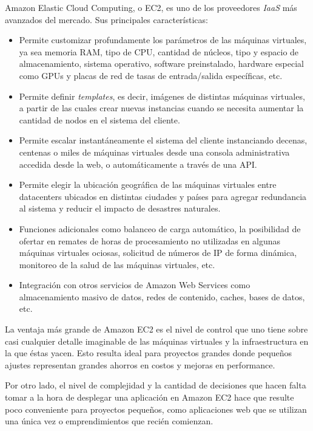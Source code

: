 \documentclass[a4paper,10pt,twoside]{article}
\begin{document}
Amazon Elastic Cloud Computing, o EC2, es uno de los proveedores \emph{IaaS} más avanzados del mercado. Sus principales características:

\begin{itemize}
	\item Permite customizar profundamente los parámetros de las máquinas virtuales, ya sea memoria RAM, tipo de CPU, cantidad de núcleos, tipo y espacio de almacenamiento, sistema operativo, software preinstalado, hardware especial como GPUs y placas de red de tasas de entrada/salida específicas, etc.

	\item Permite definir \emph{templates}, es decir, imágenes de distintas máquinas virtuales, a partir de las cuales crear nuevas instancias cuando se necesita aumentar la cantidad de nodos en el sistema del cliente.

	\item Permite escalar instantáneamente el sistema del cliente instanciando decenas, centenas o miles de máquinas virtuales desde una consola administrativa accedida desde la web, o automáticamente a través de una API.

	\item Permite elegir la ubicación geográfica de las máquinas virtuales entre datacenters ubicados en distintas ciudades y países para agregar redundancia al sistema y reducir el impacto de desastres naturales.

	\item Funciones adicionales como balanceo de carga automático, la posibilidad de ofertar en remates de horas de procesamiento no utilizadas en algunas máquinas virtuales ociosas, solicitud de números de IP de forma dinámica, monitoreo de la salud de las máquinas virtuales, etc.

	\item Integración con otros servicios de Amazon Web Services como almacenamiento masivo de datos, redes de contenido, caches, bases de datos, etc.
\end{itemize}

La ventaja más grande de Amazon EC2 es el nivel de control que uno tiene sobre casi cualquier detalle imaginable de las máquinas virtuales y la infraestructura en la que éstas yacen. Esto resulta ideal para proyectos grandes donde pequeños ajustes representan grandes ahorros en costos y mejoras en performance.

Por otro lado, el nivel de complejidad y la cantidad de decisiones que hacen falta tomar a la hora de desplegar una aplicación en Amazon EC2 hace que resulte poco conveniente para proyectos pequeños, como aplicaciones web que se utilizan una única vez o emprendimientos que recién comienzan.
\end{document}
